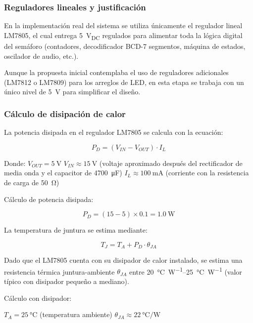 \documentclass[10pt,onecolumn]{IEEEtran}
\begin{document}
\subsubsection{Reguladores lineales y justificación}

En la implementación real del sistema se utiliza únicamente el regulador lineal LM7805, el cual entrega \SI{5}{\volt_{DC}} regulados para alimentar toda la lógica digital del semáforo (contadores, decodificador BCD-7 segmentos, máquina de estados, oscilador de audio, etc.).

Aunque la propuesta inicial contemplaba el uso de reguladores adicionales (LM7812 o LM7809) para los arreglos de LED, en esta etapa se trabaja con un único nivel de \SI{5}{\volt} para simplificar el diseño.
\\
\subsubsection{Cálculo de disipación de calor}

La potencia disipada en el regulador LM7805 se calcula con la ecuación:

\begin{equation}
P_D = (V_{IN} - V_{OUT}) \cdot I_L
\label{eq:potencia_disipada}
\end{equation}

Donde:
$V_{OUT} = \SI{5}{\volt}$
$V_{IN} \approx \SI{15}{\volt}$ (voltaje aproximado después del rectificador de media onda y el capacitor de \SI{4700}{\micro\farad})
$I_L \approx \SI{100}{\milli\ampere}$ (corriente con la resistencia de carga de \SI{50}{\ohm})

Cálculo de potencia disipada:

\begin{equation}
P_D = (15 - 5) \times 0.1 = \SI{1.0}{\watt}
\end{equation}

La temperatura de juntura se estima mediante:

\begin{equation}
T_J = T_A + P_D \cdot \theta_{JA}
\label{eq:temp_juntura}
\end{equation}

Dado que el LM7805 cuenta con su disipador de calor instalado, se estima una resistencia térmica juntura-ambiente $\theta_{JA}$ entre \SIrange{20}{25}{\celsius\per\watt} (valor típico con disipador pequeño a mediano).

Cálculo con disipador:

$T_A = \SI{25}{\celsius}$ (temperatura ambiente)
$\theta_{JA} \approx \SI{22}{\celsius\per\watt}$
\end{document}
